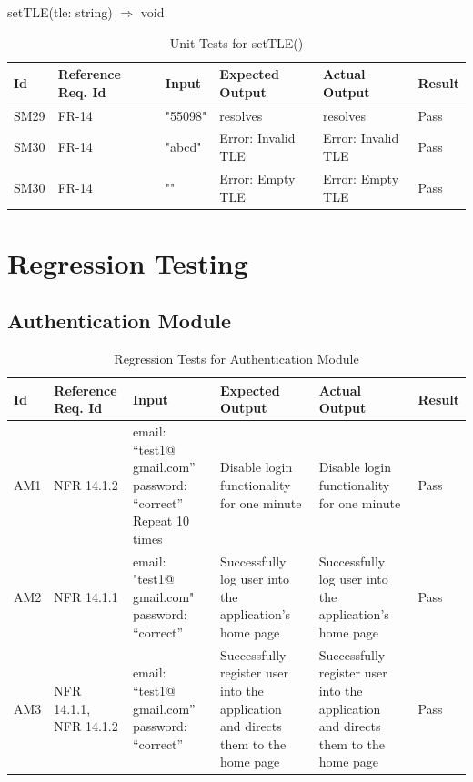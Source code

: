 \documentclass[12pt, titlepage]{article}
\begin{document}
setTLE(tle: string) $\Rightarrow$ void

\begin{center}
\begin{longtable}{|p{1cm} | p{2cm} |p{2cm}| p{2cm} |p{2cm}| p{2cm}|}
\caption{Unit Tests for setTLE()}
\hline
\textbf{Id} & \textbf{Reference Req. Id} & \textbf{Input} & \textbf{Expected Output} & \textbf{Actual Output} & \textbf{Result} \\
\hline
SM29 & FR-14 & { "55098" } & resolves
 & resolves & Pass
\\
\hline
SM30 & FR-14 & { "abcd" } & Error: Invalid TLE
 & Error: Invalid TLE & Pass
 \\
\hline
SM30 & FR-14 & { "" } & Error: Empty TLE
 & Error: Empty TLE & Pass
 \\
 \hline
\end{longtable}

\end{center}


\section{Regression Testing}

\subsection{Authentication Module}

\begin{center}
\begin{longtable}{|p{1cm} | p{2cm} |p{2cm}| p{2cm} |p{2cm}| p{2cm}|}
\caption{Regression Tests for Authentication Module}
\hline
\textbf{Id} & \textbf{Reference Req. Id} & \textbf{Input} & \textbf{Expected Output} & \textbf{Actual Output} & \textbf{Result} \\
\hline
AM1 & NFR 14.1.2 & {email: “test1@ gmail.com”
password: “correct” } Repeat 10 times
 & Disable login functionality for one minute
 & Disable login functionality for one minute & Pass
\\
\hline
AM2 & NFR 14.1.1 & { email: "test1@ gmail.com"
password: “correct” }
 & Successfully log user into the application’s home page
 & Successfully log user into the application’s home page & Pass
\\
\hline
AM3 & NFR 14.1.1, NFR 14.1.2 & { email: “test1@ gmail.com”
password: “correct” }
 & Successfully register user into the application and directs them to the home page
 & Successfully register user into the application and directs them to the home page & Pass
\\
\hline

\end{longtable}

\end{center}
\end{document}
